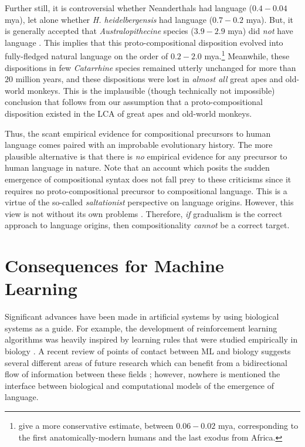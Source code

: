 \documentclass{article}
\begin{document}
Further still, it is controversial whether Neanderthals had language ($0.4-0.04$ {\sc mya}), let alone whether {\it H. heidelbergensis} had language ($0.7-0.2$ {\sc mya}). But, it is generally accepted that {\it Australopithecine} species ($3.9-2.9$ {\sc mya}) did {\it not} have language \citep{Fitch-2010}. This implies that this proto-compositional disposition evolved into fully-fledged natural language on the order of $0.2-2.0$ {\sc mya}.\footnote{\citet{Berwick-Chomsky-2016} give a more conservative estimate, between $0.06-0.02$ {\sc mya}, corresponding to the first anatomically-modern humans and the last exodus from Africa.} Meanwhile, these dispositions in few {\it Catarrhine} species remained utterly unchanged for more than $20$ million years, and these dispositions were lost in {\it almost all} great apes and old-world monkeys. This is the implausible (though technically not impossible) conclusion that follows from our assumption that a proto-compositional disposition existed in the LCA of great apes and old-world monkeys.  

Thus, the scant empirical evidence for compositional precursors to human language comes paired with an improbable evolutionary history. The more plausible alternative is that there is {\it no} empirical evidence for any precursor to human language in nature. Note that an account which posits the sudden emergence of compositional syntax does not fall prey to these criticisms since it requires no proto-compositional precursor to compositional language. This is a virtue of the so-called {\it saltationist} perspective on language origins. However, this view is not without its own problems \citep{LaCroix-2019-Salt-v-Grad}. Therefore, {\it if} gradualism is the correct approach to language origins, then compositionality {\it cannot} be a correct target.

\section{Consequences for Machine Learning}

Significant advances have been made in artificial systems by using biological systems as a guide. For example, the development of reinforcement learning algorithms was heavily inspired by learning rules that were studied empirically in biology \citep{Bush-Mosteller-1955, Rescorla-Wagner-1972, Roth-Erev-1995, Erev-Roth-1998}. A recent review of points of contact between ML and biology suggests several different areas of future research which can benefit from a bidirectional flow of information between these fields \citep{Neftci-Averbeck-2019}; however, nowhere is mentioned the interface between biological and computational models of the emergence of language.
\end{document}

